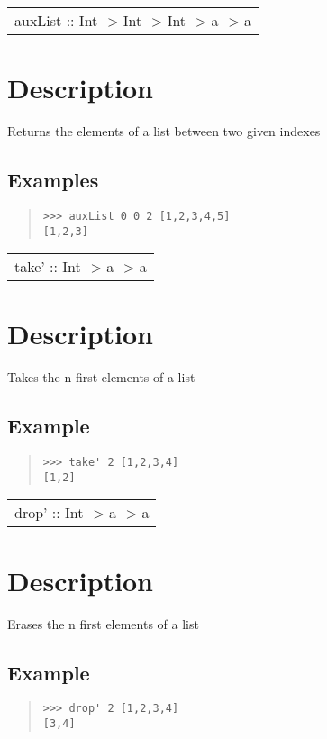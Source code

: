 \begin{haddockdesc}
\item[\begin{tabular}{@{}l}
auxList :: Int -> Int -> Int -> {\char 91}a{\char 93} -> {\char 91}a{\char 93}
\end{tabular}]
{\haddockbegindoc
\section*{Description}
Returns the elements of a list between two given indexes\par
\subsection*{Examples}
\begin{quote}
{\haddockverb\begin{verbatim}
>>> auxList 0 0 2 [1,2,3,4,5]
[1,2,3]

\end{verbatim}}
\end{quote}}
\end{haddockdesc}
\begin{haddockdesc}
\item[\begin{tabular}{@{}l}
take' :: Int -> {\char 91}a{\char 93} -> {\char 91}a{\char 93}
\end{tabular}]
{\haddockbegindoc
\section*{Description}
Takes the n first elements of a list\par
\subsection*{Example}
\begin{quote}
{\haddockverb\begin{verbatim}
>>> take' 2 [1,2,3,4]
[1,2]

\end{verbatim}}
\end{quote}}
\end{haddockdesc}
\begin{haddockdesc}
\item[\begin{tabular}{@{}l}
drop' :: Int -> {\char 91}a{\char 93} -> {\char 91}a{\char 93}
\end{tabular}]
{\haddockbegindoc
\section*{Description}
Erases the n first elements of a list\par
\subsection*{Example}
\begin{quote}
{\haddockverb\begin{verbatim}
>>> drop' 2 [1,2,3,4]
[3,4]

\end{verbatim}}
\end{quote}}
\end{haddockdesc}
